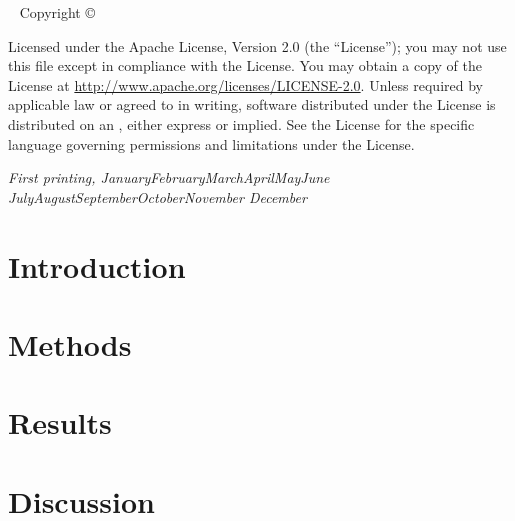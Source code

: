 \documentclass[a4paper,twoside]{tufte-book}
\title[Proliferation and Differentiation in cancer]{%
  \setlength{\parindent}{0pt}%
  Proliferation and \par
  Differentiation \par
  in Cancer
  \vspace{1cm}
}
\author[Gil Tomás]{Gil Tomás}
\newcommand{\monthyear}{%
  \ifcase\month\or January\or February\or March\or April\or May\or June\or
  July\or August\or September\or October\or November\or
  December\fi\space\number\year
}
\newcommand{\blankpage}{\newpage\hbox{}\thispagestyle{empty}\newpage}
\begin{document}
\frontmatter

\blankpage


\newpage
\begin{fullwidth}
~\vfill
\thispagestyle{empty}
\setlength{\parindent}{0pt}
\setlength{\parskip}{\baselineskip}
Copyright \copyright\ \the\year\ \thanklessauthor

\par{}

\par{}

\par Licensed under the Apache License, Version 2.0 (the ``License''); you may
not use this file except in compliance with the License. You may obtain a copy
of the License at \url{http://www.apache.org/licenses/LICENSE-2.0}. Unless
required by applicable law or agreed to in writing, software distributed under
the License is distributed on an , either express or implied. See the License for the
specific language governing permissions and limitations under the
License.

\par\textit{First printing, \monthyear}
\end{fullwidth}


\tableofcontents
\listoffigures
\listoftables


\chapter{Introduction}
\label{chap:introduction}







\chapter{Methods}
\label{chap:methods}




\chapter{Results}
\label{chap:results}




\chapter{Discussion}
\label{chap:discussion}






\backmatter



\end{document}
